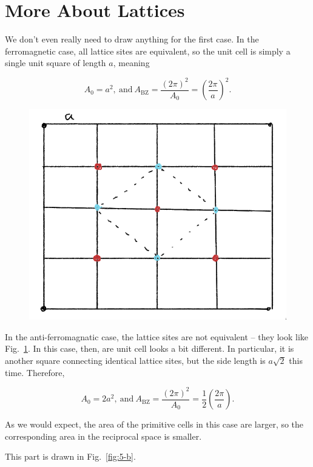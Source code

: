 \section{More About Lattices}

\begin{parts}
\item We don't even really need to draw anything for the first case. In the ferromagnetic case, all lattice sites are equivalent, so the unit cell is simply a single unit square of length $a$, meaning

  
  \begin{equation}
    A_0 = a^2,\ \text{and}\ A_{\mathrm{BZ}} = \frac{(2\pi)^2}{A_0} = \left( \frac{2\pi}{a} \right)^2.
  \end{equation}

  \begin{figure}
    \centering
    \includegraphics[width=0.6\linewidth]{./res/Pics/5-a.png}
    \caption{}\label{fig:5-a}
  \end{figure}

  In the anti-ferromagnatic case, the lattice sites are not equivalent -- they look like Fig.~\ref{fig:5-a}. In this case, then, are unit cell looks a bit different. In particular, it is another square connecting identical lattice sites, but the side length is $a\sqrt{2}$ this time. Therefore,

  \begin{equation}
    A_0 = 2a^2,\ \text{and}\ A_{\mathrm{BZ}} = \frac{(2\pi)^2}{A_0} = \frac{1}{2}\left( \frac{2\pi}{a} \right).
  \end{equation}

  As we would expect, the area of the primitive cells in this case are larger, so the corresponding area in the reciprocal space is smaller.



\item This part is drawn in Fig.~\ref{fig:5-b}.


\end{parts}
